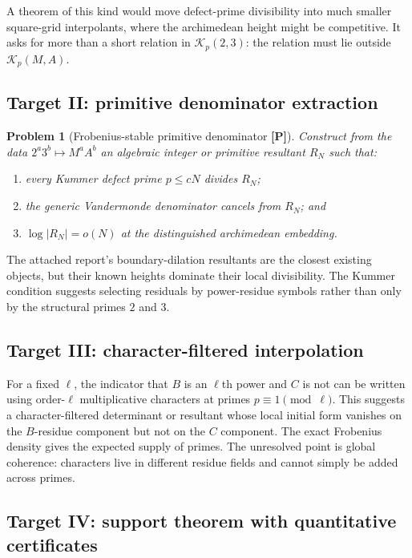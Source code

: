 \documentclass[11pt]{article}
\newtheorem{problem}[theorem]{Problem}
\theoremstyle{definition}
\newcommand{\Rel}{\mathcal K}
\newcommand{\statusP}{\textcolor{orange!70!black}{\textbf{[P]}}}
\begin{document}
A theorem of this kind would move defect-prime divisibility into much smaller square-grid
interpolants, where the archimedean height might be competitive.  It asks for more than a
short relation in $\Rel_p(2,3)$: the relation must lie outside $\Rel_p(M,A)$.

\subsection{Target II: primitive denominator extraction}

\begin{problem}[Frobenius-stable primitive denominator \statusP]
Construct from the data
$2^a3^b\mapsto M^aA^b$ an algebraic integer or primitive resultant $R_N$ such that:
\begin{enumerate}[label=(\roman*)]
\item every Kummer defect prime $p\le cN$ divides $R_N$;
\item the generic Vandermonde denominator cancels from $R_N$; and
\item $\log|R_N|=o(N)$ at the distinguished archimedean embedding.
\end{enumerate}
\end{problem}

The attached report's boundary-dilation resultants are the closest existing objects, but their
known heights dominate their local divisibility.  The Kummer condition suggests selecting
residuals by power-residue symbols rather than only by the structural primes $2$ and $3$.

\subsection{Target III: character-filtered interpolation}

For a fixed $\ell$, the indicator that $B$ is an $\ell$th power and $C$ is not can be written
using order-$\ell$ multiplicative characters at primes $p\equiv1\pmod\ell$.  This suggests a
character-filtered determinant or resultant whose local initial form vanishes on the
$B$-residue component but not on the $C$ component.  The exact Frobenius density gives the
expected supply of primes.  The unresolved point is global coherence: characters live in
different residue fields and cannot simply be added across primes.

\subsection{Target IV: support theorem with quantitative certificates}
\end{document}
